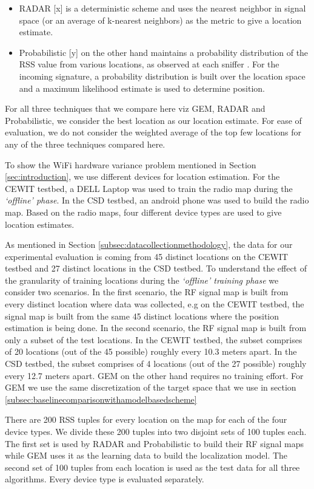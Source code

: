 \documentclass{Localization-PaperWriteupDraft}
\begin{document}
\begin{itemize}
\item RADAR [x] is a deterministic scheme and uses the nearest neighbor in signal space (or an average of k-nearest neighbors) as the metric to give a location estimate. 
\item Probabilistic [y] on the other hand maintains a probability distribution of the RSS value from various locations, as observed at each sniffer . For the incoming signature, a probability distribution is built over the location space and a maximum likelihood estimate is used to determine position.
\end{itemize}

For all three techniques that we compare here viz GEM, RADAR and Probabilistic, we consider the best location as our location estimate. For ease of evaluation, we do not consider the weighted average of the top few locations for any of the three techniques compared here. 

To show the WiFi hardware variance problem mentioned in Section \ref{sec:introduction}, we use different devices for location estimation. For the CEWIT testbed, a DELL Laptop was used to train the radio map during the {\it `offline' phase}. In the CSD testbed, an android phone was used to build the radio map. Based on the radio maps, four different device types are used to give location estimates. 

As mentioned in Section \ref{subsec:datacollectionmethodology}, the data for our experimental evaluation is coming from 45 distinct locations on the CEWIT testbed and 27 distinct locations in the CSD testbed. To understand the effect of the granularity of training locations during the {\it `offline' training phase} we consider two scenarios. In the first scenario, the RF signal map is built from every distinct location where data was collected, e.g on the CEWIT testbed, the signal map is built from the same 45 distinct locations where the position estimation is being done. In the second scenario, the RF signal map is built from only a subset of the test locations. In the CEWIT testbed, the subset comprises of 20 locations (out of the 45 possible) roughly every 10.3 meters apart.   In the CSD testbed, the subset comprises of 4 locations (out of the 27 possible) roughly every 12.7 meters apart.  GEM on the other hand requires no training effort. For GEM we use the same discretization of the target space that we use in section \ref{subsec:baselinecomparisonwithamodelbasedscheme}

There are 200 RSS tuples for every location on the map for each of the four device types. We divide these 200 tuples into two disjoint sets of 100 tuples each. The first set is used by RADAR and Probabilistic to build their RF signal maps while GEM uses it as the learning data to build the localization model.  The second set of 100 tuples from each location is used as the test data for all three algorithms. Every device type is evaluated separately. 
\end{document}
